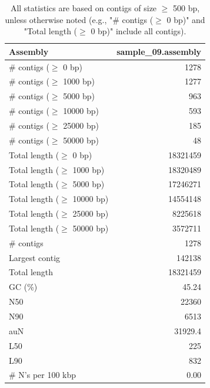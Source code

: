 \documentclass[12pt,a4paper]{article}
\begin{document}
\begin{table}[ht]
\begin{center}
\caption{All statistics are based on contigs of size $\geq$ 500 bp, unless otherwise noted (e.g., "\# contigs ($\geq$ 0 bp)" and "Total length ($\geq$ 0 bp)" include all contigs).}
\begin{tabular}{|l*{1}{|r}|}
\hline
Assembly & sample\_09.assembly \\ \hline
\# contigs ($\geq$ 0 bp) & 1278 \\ \hline
\# contigs ($\geq$ 1000 bp) & 1277 \\ \hline
\# contigs ($\geq$ 5000 bp) & 963 \\ \hline
\# contigs ($\geq$ 10000 bp) & 593 \\ \hline
\# contigs ($\geq$ 25000 bp) & 185 \\ \hline
\# contigs ($\geq$ 50000 bp) & 48 \\ \hline
Total length ($\geq$ 0 bp) & 18321459 \\ \hline
Total length ($\geq$ 1000 bp) & 18320489 \\ \hline
Total length ($\geq$ 5000 bp) & 17246271 \\ \hline
Total length ($\geq$ 10000 bp) & 14554148 \\ \hline
Total length ($\geq$ 25000 bp) & 8225618 \\ \hline
Total length ($\geq$ 50000 bp) & 3572711 \\ \hline
\# contigs & 1278 \\ \hline
Largest contig & 142138 \\ \hline
Total length & 18321459 \\ \hline
GC (\%) & 45.24 \\ \hline
N50 & 22360 \\ \hline
N90 & 6513 \\ \hline
auN & 31929.4 \\ \hline
L50 & 225 \\ \hline
L90 & 832 \\ \hline
\# N's per 100 kbp & 0.00 \\ \hline
\end{tabular}
\end{center}
\end{table}
\end{document}
